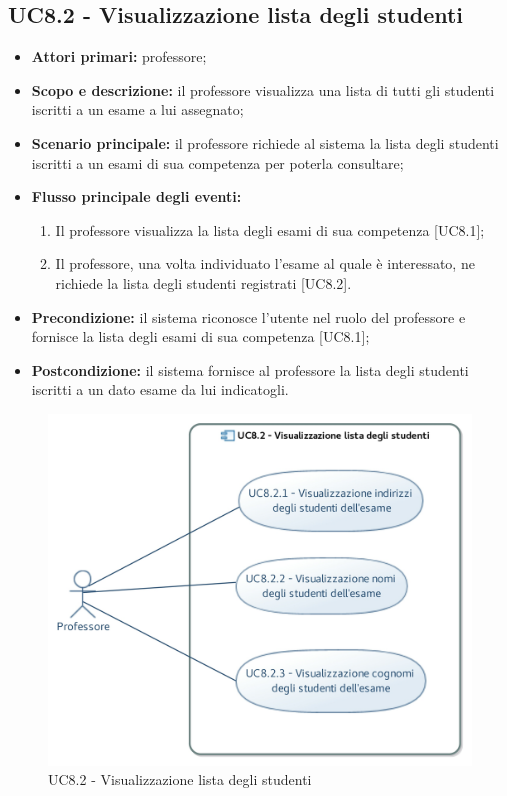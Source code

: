 \documentclass[AnalisiDeiRequisiti.tex]{subfiles}
\begin{document}
\subsection{UC8.2 - Visualizzazione lista degli studenti}
\begin{itemize}
	\item \textbf{Attori primari:} professore;
	\item \textbf{Scopo e descrizione:} il professore visualizza una lista di tutti gli studenti iscritti a un esame a lui assegnato;
	\item \textbf{Scenario principale:} il professore richiede al sistema la lista degli studenti iscritti a un esami di sua competenza per poterla consultare;
	\item \textbf{Flusso principale degli eventi:}
	\begin{enumerate}
		\item Il professore visualizza la lista degli esami di sua competenza [UC8.1];
		\item Il professore, una volta individuato l'esame al quale è interessato, ne richiede la lista degli studenti registrati [UC8.2].
	\end{enumerate}
	\item \textbf{Precondizione:} il sistema riconosce l'utente nel ruolo del professore e fornisce la lista degli esami di sua competenza [UC8.1]; 
	\item \textbf{Postcondizione:} il sistema fornisce al professore la lista degli studenti iscritti a un dato esame da lui indicatogli.
\end{itemize}
\begin{figure}[H]
	\centering
	\includegraphics[width=0.7\linewidth]{UC8_2.jpg}
	\caption{UC8.2 - Visualizzazione lista degli studenti}
	\label{UC8.2 - Visualizzazione lista degli studenti}
\end{figure}
\end{document}
